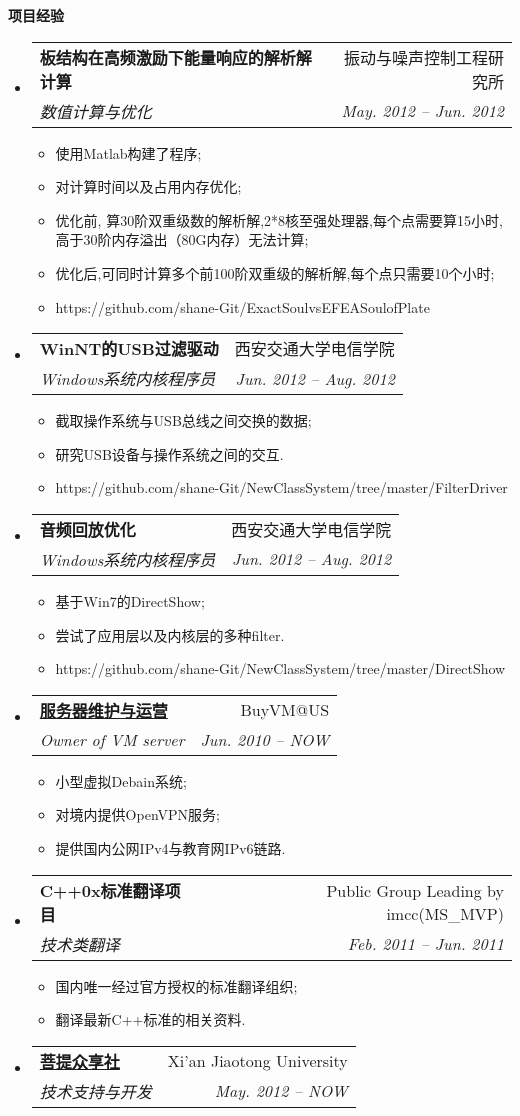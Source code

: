 \documentclass[letterpaper,11pt]{article}
\makeatletter
\newcommand{\resitem}[1]{\item #1 \vspace{-2pt}}
\newcommand{\resheading}[1]{{\large \colorbox{mygrey}{\begin{minipage}{\textwidth}{\textbf{#1 \vphantom{p\^{E}}}}\end{minipage}}}}
\newcommand{\ressubheading}[4]{
\begin{tabular*}{6.5in}{l@{\extracolsep{\fill}}r}
		\textbf{#1} & #2 \\
		\textit{#3} & \textit{#4} \\
\end{tabular*}\vspace{-6pt}}
\makeatother
\begin{document}
\begin{CJK}{UTF8}{gbsn}
\resheading{项目经验}
	\begin{itemize}
		\item 
			\ressubheading{板结构在高频激励下能量响应的解析解计算}{振动与噪声控制工程研究所}{数值计算与优化}{May. 2012 -- Jun. 2012}
				{ \footnotesize
				\begin{itemize}
					\resitem{使用Matlab构建了程序;}
					\resitem{对计算时间以及占用内存优化;}
					\resitem{优化前, 算30阶双重级数的解析解,2*8核至强处理器,每个点需要算15小时, 高于30阶内存溢出（80G内存）无法计算;}
					\resitem{优化后,可同时计算多个前100阶双重级的解析解,每个点只需要10个小时;}
					\resitem{https://github.com/shane-Git/ExactSoulvsEFEASoulofPlate}
				\end{itemize}
				}
		\item 
			\ressubheading{WinNT的USB过滤驱动}{西安交通大学电信学院}{Windows系统内核程序员}{Jun. 2012 -- Aug. 2012}
				{ \footnotesize
				\begin{itemize}
					\resitem{截取操作系统与USB总线之间交换的数据;}
					\resitem{研究USB设备与操作系统之间的交互.}
					\resitem{https://github.com/shane-Git/NewClassSystem/tree/master/FilterDriver}
				\end{itemize}
				}
		\item 
			\ressubheading{音频回放优化}{西安交通大学电信学院}{Windows系统内核程序员}{Jun. 2012 -- Aug. 2012}
				{ \footnotesize
				\begin{itemize}
					\resitem{基于Win7的DirectShow;}
					\resitem{尝试了应用层以及内核层的多种filter.}
					\resitem{https://github.com/shane-Git/NewClassSystem/tree/master/DirectShow}
				\end{itemize}
				}
		\item 
			\ressubheading{\href{http://svr6.haohaizi.us/}{服务器维护与运营}}{BuyVM@US}{Owner of VM server}{Jun. 2010 -- NOW}
				{ \footnotesize
				\begin{itemize}
					\resitem{小型虚拟Debain系统;}
					\resitem{对境内提供OpenVPN服务;}
					\resitem{提供国内公网IPv4与教育网IPv6链路.}
				\end{itemize}
				}
		\item
			\ressubheading{C++0x标准翻译项目}{Public Group Leading by imcc(MS\_MVP)}{技术类翻译} {Feb. 2011 -- Jun. 2011}
				{ \footnotesize
				\begin{itemize}
					\resitem{国内唯一经过官方授权的标准翻译组织;}
					\resitem{翻译最新C++标准的相关资料.}
				\end{itemize}
          		}
\item 
			\ressubheading{\href{http://pt.xjtuns.cn/}{菩提众享社}}{Xi'an Jiaotong University}{技术支持与开发}{May. 2012 -- NOW}

\end{itemize}
\end{CJK}
\end{document}
